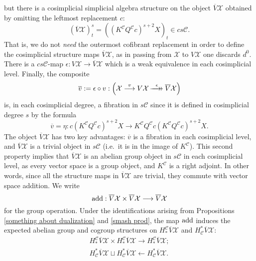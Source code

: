 \documentclass[11pt]{amsart} \renewcommand{\baselinestretch}{1.2}
\theoremstyle{plain}
\numberwithin{equation}{section} %
\theoremstyle{plain}
\numberwithin{equation}{chapter} %
\renewcommand{\to}{\longrightarrow}
\newcommand{\from}{\longleftarrow}
\newcommand{\calx}{\mathcal{X}}
\newcommand{\calc}{\mathcal{C}}
\newcommand{\epi}{{\,\makebox[0cm][l]{\ensuremath\to}\to{}}}
\begin{document}
\begin{Operations on the Bousfield-Kan spectral sequence}
but there is a cosimplicial simplicial algebra structure on the object $\overline{V}\calx$ obtained by omitting the leftmost replacement $c$:
\[(\overline{V}\calx)^s_t=((K^{\calc}Q^{\calc}c)^{s+2}X)_t\in cs\calc.\]
That is, we do not \emph{need} the outermost cofibrant replacement in order to define the cosimplicial structure maps $\overline{V}\calx$, as in passing from $\calx$ to $V\calx$ one discards $d^0$. There is a $cs\calc$-map $\epsilon:V\calx \to \overline{V}\calx $ which is a weak equivalence in each cosimplicial level. Finally, the composite
\[\overline{v}:=\epsilon\circ v:\left(\calx\overset{v}{\to}V\calx\overset{\epsilon}{\epi} \overline{V}\calx\right)\]
is, in each cosimplicial degree, a fibration in $s\calc$ since it is defined in cosimplicial degree $s$ by the formula \[\overline{v}=\eta:c(K^{\calc}Q^{\calc}c)^{s+2}X\to K^{\calc}Q^{\calc}c(K^{\calc}Q^{\calc}c)^{s+2}X.\]
 The object $\overline{V}\calx$ has two key advantages: $\overline{v}$ is a fibration in each cosimplicial level, and $\overline{V}\calx$ is a trivial object in $s\calc$ (i.e.\ it is in the image of $K^{\calc}$). This second property implies that  $\overline{V}\calx$ is an abelian group object in $s\calc$ in each cosimplicial level, as every vector space is a group object, and $K^{\calc}$ is a right adjoint. In other words, since all the structure maps in $\overline{V}\calx$ are trivial, they commute  with vector space addition. We write
\[\textup{add}:\overline{V}\calx\times \overline{V}\calx\to \overline{V}\calx\]
for the group operation. Under the identifications arising from Propositions \ref{something about dualization} and \ref{smash prod}, the map $\textup{add}$ induces the expected abelian group and cogroup structures on $H_*^\calc\overline{V}\calx$ and $H^*_\calc\overline{V}\calx$:
\begin{gather*}
H_*^\calc\overline{V}\calx\times H_*^\calc\overline{V}\calx\to H_*^\calc\overline{V}\calx;\\
H^*_\calc\overline{V}\calx\sqcup H^*_\calc\overline{V}\calx\from H^*_\calc\overline{V}\calx.
\end{gather*}


\end{Operations on the Bousfield-Kan spectral sequence}
\end{document}
